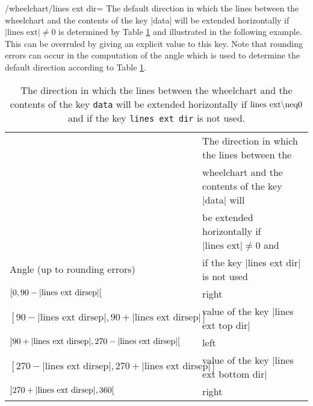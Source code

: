 \documentclass[a4paper,english,dvipsnames]{ltxdoc}
\begin{document}
\begin{key}{/wheelchart/lines ext dir=}
The default direction in which the lines between the wheelchart and the contents of the key |data| will be extended horizontally if $\text{|lines ext|}\neq 0$ is determined by Table \ref{tablelinesextdir} and illustrated in the following example. This can be overruled by giving an explicit value to this key. Note that rounding errors can occur in the computation of the angle which is used to determine the default direction according to Table \ref{tablelinesextdir}.
\begin{table}[ht]
\centering
\begin{tabular}{ll}
 & The direction in which the lines between the\\
 & wheelchart and the contents of the key |data| will\\
 & be extended horizontally if $\text{|lines ext|}\neq 0$ and\\
Angle (up to rounding errors) & if the key |lines ext dir| is not used\\\hline
$\rinterval{0}{90-\text{|lines ext dirsep|}}$ & right\\
$[90-\text{|lines ext dirsep|},90+\text{|lines ext dirsep|}]$ & value of the key |lines ext top dir|\\
$\ointerval{90+\text{|lines ext dirsep|}}{270-\text{|lines ext dirsep|}}$ & left\\
$[270-\text{|lines ext dirsep|},270+\text{|lines ext dirsep|}]$ & value of the key |lines ext bottom dir|\\
$\ointerval{270+\text{|lines ext dirsep|}}{360}$ & right\\
\end{tabular}
\caption{The direction in which the lines between the wheelchart and the contents of the key \texttt{data} will be extended horizontally if $\text{\ttfamily lines ext}\neq 0$ and if the key \texttt{lines ext dir} is not used.}\label{tablelinesextdir}
\end{table}
\begin{codeexample}[width=10cm,preamble={\usetikzlibrary{patterns}}]
\end{codeexample}
\end{key}
\end{document}
